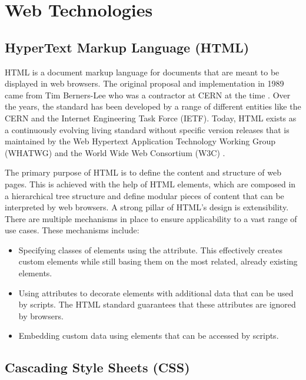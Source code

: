 \chapter{Web Technologies}
\label{chap:WebTechnologies}

\section{HyperText Markup Language (HTML)}
\label{sec:HTML}

HTML is a document markup language for documents that are meant to be displayed in web browsers.
The original proposal and implementation in 1989 came from Tim Berners-Lee who was a contractor at CERN at the time \parencite{TBLProposal}.
Over the years, the standard has been developed by a range of different entities like the CERN and the Internet Engineering Task Force (IETF). 
Today, HTML exists as a continuously evolving living standard without specific version releases that is maintained by the Web Hypertext Application Technology Working Group (WHATWG) and the World Wide Web Consortium (W3C) \parencite{HTML}.

The primary purpose of HTML is to define the content and structure of web pages.
This is achieved with the help of HTML elements, which are composed in a hierarchical tree structure and define modular pieces of content that can be interpreted by web browsers.
A strong pillar of HTML's design is extensibility. 
There are multiple mechanisms in place to ensure applicability to a vast range of use cases.
These mechanisms include:

\begin{itemize}
\item Specifying classes of elements using the  attribute.
This effectively creates custom elements while still basing them on the most related, already existing elements.

\item Using  attributes to decorate elements with additional data that can be used by scripts.
The HTML standard guarantees that these attributes are ignored by browsers.

\item Embedding custom data using  elements that can be accessed by scripts.
\end{itemize}


\section{Cascading Style Sheets (CSS)}
\label{sec:CSS}

